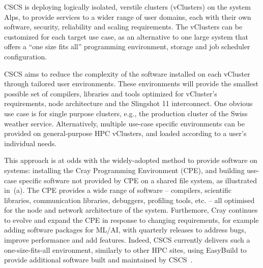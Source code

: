 CSCS is deploying logically isolated, verstile clusters (vClusters) on the \crayex system Alps, to provide services to a wider range of user domains, each with their own software, security, reliability and scaling requirements.
The vClusters can be customized for each target use case, as an alternative to one large system that offers a ``one size fits all'' programming environment, storage and job scheduler configuration.

CSCS aims to reduce the complexity of the software installed on each vCluster through tailored user environments.
These environments will provide the smallest possible set of compilers, libraries and tools optimized for vCluster's requirements, node architecture and the Slingshot 11 interconnect.
One obvious use case is for single purpose clusters, e.g., the production cluster of the Swiss weather service.
Alternatively, multiple use-case specific environments can be provided on general-purpose HPC vClusters, and loaded according to a user's individual needs.

This approach is at odds with the widely-adopted method to provide software on \crayex systems: installing the Cray Programming Environment (CPE), and building use-case specific software not provided by CPE on a shared file system, as illustrated in~(a).
The CPE provides a wide range of software -- compilers, scientific libraries, communication libraries, debuggers, profiling tools, etc. -- all optimised for the node and network architecture of the system.
Furthemore, Cray continues to evolve and expand the CPE in response to changing requirements, for example adding software packages for ML/AI, with quarterly releases to address bugs, improve performance and add features.
Indeed, CSCS currently delivers such a one-size-fits-all environment, similarly to other HPC sites, using EasyBuild to provide additional software built and maintained by CSCS~\cite{forai:cug16}.

